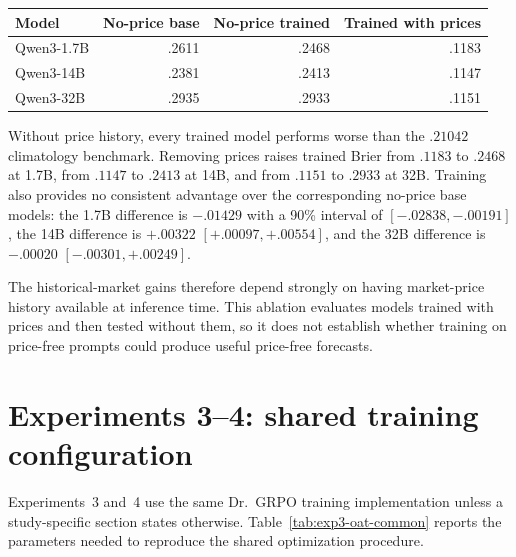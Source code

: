 \begin{center}
\begin{minipage}{0.84\linewidth}
\centering
{}
\label{tab:exp4-price-ablation}
\small
\begin{tabular}{lrrr}
\toprule
Model & No-price base & No-price trained & Trained with prices \\
\midrule
Qwen3-1.7B & .2611 & .2468 & .1183 \\
Qwen3-14B & .2381 & .2413 & .1147 \\
Qwen3-32B & .2935 & .2933 & .1151 \\
\bottomrule
\end{tabular}
\end{minipage}
\end{center}

Without price history, every trained model performs worse than the $.21042$ climatology benchmark.
Removing prices raises trained Brier from $.1183$ to $.2468$ at 1.7B, from $.1147$ to $.2413$ at 14B, and from $.1151$ to $.2933$ at 32B.
Training also provides no consistent advantage over the corresponding no-price base models: the 1.7B difference is $-.01429$ with a 90\% interval of $[-.02838,-.00191]$, the 14B difference is $+.00322$ $[+.00097,+.00554]$, and the 32B difference is $-.00020$ $[-.00301,+.00249]$.

The historical-market gains therefore depend strongly on having market-price history available at inference time.
This ablation evaluates models trained with prices and then tested without them, so it does not establish whether training on price-free prompts could produce useful price-free forecasts.

\section{Experiments 3--4: shared training configuration}
\label{app:exp3-complete-training-setup}

Experiments~3 and~4 use the same Dr.~GRPO training implementation unless a study-specific section states otherwise.
Table~\ref{tab:exp3-oat-common} reports the parameters needed to reproduce the shared optimization procedure.

